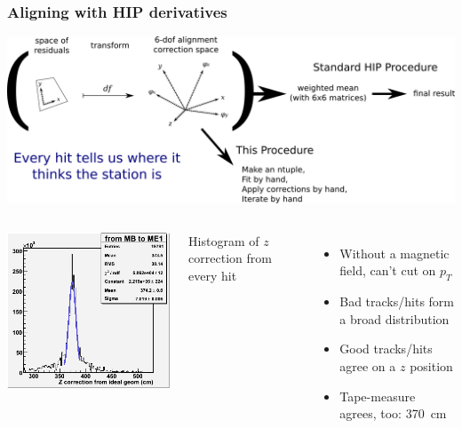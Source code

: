 \documentclass[compress]{beamer}
\begin{document}
\begin{frame}
\frametitle{Aligning with HIP derivatives}
\small

\includegraphics[width=\linewidth]{transformation.png}

\begin{columns}
\includegraphics[width=\linewidth]{hist_0and1.png}

Histogram of $z$ correction from every hit

\begin{itemize}
\item Without a magnetic field, can't cut on $p_T$
\item Bad tracks/hits form a broad distribution
\item Good tracks/hits agree on a $z$ position
\item Tape-measure agrees, too: 370~cm
\end{itemize}
\end{columns}
\end{frame}
\end{document}
